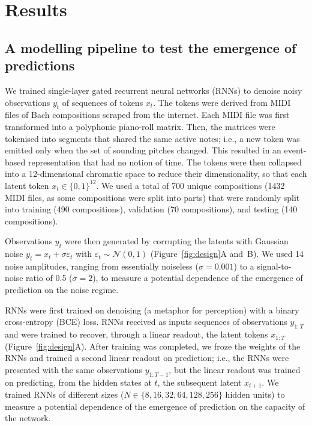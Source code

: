 
\section*{Results}

  \subsection*{A modelling pipeline to test the emergence of predictions}

    We trained single-layer gated recurrent neural networks (RNNs) to denoise noisy observations $y_t$ of sequences of tokens $x_t$. The tokens were derived from MIDI files of Bach compositions scraped from the internet. Each MIDI file was first transformed into a polyphonic piano-roll matrix. Then, the matrices were tokenised into segments that shared the same active notes; i.e., a new token was emitted only when the set of sounding pitches changed. This resulted in an event-based representation that had no notion of time. The tokens were then collapsed into a 12-dimensional chromatic space to reduce their dimensionality, so that each latent token $x_t \in \{0,1\}^{12}$. We used a total of 700 unique compositions (1432 MIDI files, as some compositions were split into parts) that were randomly split into training (490 compositions), validation (70 compositions), and testing (140 compositions).

    Observations $y_t$ were then generated by corrupting the latents with Gaussian noise $y_t = x_t + \sigma\varepsilon_t$ with $\varepsilon_t \sim \mathcal{N}\left(0, 1\right)$ (Figure~\ref{fig:design}A and~B). We used 14 noise amplitudes, ranging from essentially noiseless ($\sigma = 0.001$) to a signal-to-noise ratio of 0.5 ($\sigma = 2$), to measure a potential dependence of the emergence of prediction on the noise regime.

    RNNs were first trained on denoising (a metaphor for perception) with a binary cross-entropy (BCE) loss. RNNs received as inputs sequences of observations $y_{1:T}$ and were trained to recover, through a linear readout, the latent tokens $x_{1:T}$ (Figure~\ref{fig:design}A). After training was completed, we froze the weights of the RNNs and trained a second linear readout on prediction; i.e., the RNNs were presented with the same observations $y_{1:T-1}$, but the linear readout was trained on predicting, from the hidden states at $t$, the subsequent latent $x_{t+1}$. We trained RNNs of different sizes ($N \in \{8, 16, 32, 64, 128, 256\}$ hidden units) to measure a potential dependence of the emergence of prediction on the capacity of the network.

